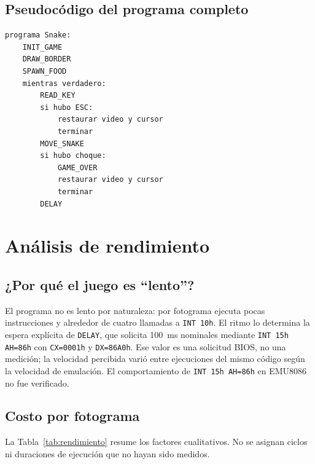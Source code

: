 \documentclass[10pt]{article}
\begin{document}
\subsection{Pseudocódigo del programa completo}
\begin{lstlisting}[language={},caption={Pseudocódigo del programa completo.},label={lst:p-total}]
programa Snake:
    INIT_GAME
    DRAW_BORDER
    SPAWN_FOOD
    mientras verdadero:
        READ_KEY
        si hubo ESC:
            restaurar video y cursor
            terminar
        MOVE_SNAKE
        si hubo choque:
            GAME_OVER
            restaurar video y cursor
            terminar
        DELAY
\end{lstlisting}

\section{Análisis de rendimiento}

\subsection{¿Por qué el juego es ``lento''?}
El programa no es lento por naturaleza: por fotograma ejecuta pocas instrucciones y alrededor de cuatro llamadas a \texttt{INT 10h}. El ritmo lo determina la espera explícita de \texttt{DELAY}, que solicita 100~ms nominales mediante \texttt{INT 15h AH=86h} con \texttt{CX=0001h} y \texttt{DX=86A0h}. Ese valor es una solicitud BIOS, no una medición; la velocidad percibida varió entre ejecuciones del mismo código según la velocidad de emulación. El comportamiento de \texttt{INT 15h AH=86h} en EMU8086 no fue verificado.

\subsection{Costo por fotograma}
La Tabla~\ref{tab:rendimiento} resume los factores cualitativos. No se asignan ciclos ni duraciones de ejecución que no hayan sido medidos.
\end{document}

